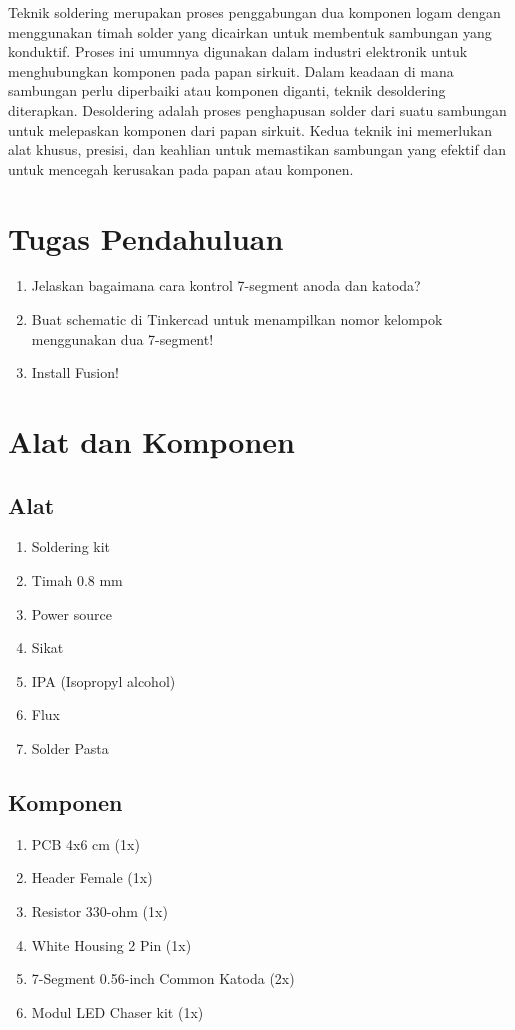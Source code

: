 Teknik soldering merupakan proses penggabungan dua komponen logam dengan menggunakan timah solder yang dicairkan untuk membentuk sambungan yang konduktif. 
Proses ini umumnya digunakan dalam industri elektronik untuk menghubungkan komponen pada papan sirkuit. Dalam keadaan di mana sambungan perlu diperbaiki 
atau komponen diganti, teknik desoldering diterapkan. Desoldering adalah proses penghapusan solder dari suatu sambungan untuk melepaskan komponen dari papan sirkuit. 
Kedua teknik ini memerlukan alat khusus, presisi, dan keahlian untuk memastikan sambungan yang efektif dan untuk mencegah kerusakan pada papan atau komponen.


\section{Tugas Pendahuluan}
\begin{enumerate}
    \item Jelaskan bagaimana cara kontrol 7-segment anoda dan katoda?
    \item Buat schematic di Tinkercad untuk menampilkan nomor kelompok menggunakan dua 7-segment!
    \item Install Fusion!
\end{enumerate}

\section{Alat dan Komponen}
\subsection{Alat}
\begin{enumerate}
    \item Soldering kit
    \item Timah 0.8 mm
    \item Power source
    \item Sikat 
    \item IPA (Isopropyl alcohol)
    \item Flux
    \item Solder Pasta
\end{enumerate}

\subsection{Komponen}
\begin{enumerate}
    \item PCB 4x6 cm                        (1x)
    \item Header Female                     (1x)
    \item Resistor 330-ohm 			        (1x)
    \item White Housing 2 Pin			    (1x)
    \item 7-Segment 0.56-inch Common Katoda	(2x)
    \item Modul LED Chaser kit              (1x)
\end{enumerate}
